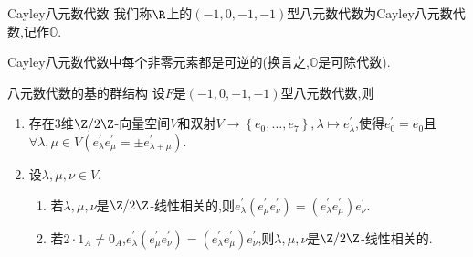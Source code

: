 \begin{definition}{Cayley八元数代数}{}
	我们称$\R$上的$\left(-1,0,-1,-1\right)$型八元数代数为Cayley八元数代数,记作$\mathbb{O}$.
\end{definition}

\begin{remark}{}{}
	Cayley八元数代数中每个非零元素都是可逆的(换言之,$\mathbb{O}$是可除代数).
\end{remark}

\begin{proposition}{八元数代数的基的群结构}{}
	设$F$是$\left(-1,0,-1,-1\right)$型八元数代数,则
	\begin{enumerate}
		\item 存在$3$维$\Z/2\Z$-向量空间$V$和双射$V\to\left\{e_{0},\ldots,e_{7}\right\},\lambda\mapsto e_{\lambda}^{\prime}$,使得$e_{0}^{\prime}=e_{0}$且$\forall\lambda,\mu\in V\left(e_{\lambda}^{\prime}e_{\mu}^{\prime}=\pm e_{\lambda+\mu}^{\prime}\right)$.
		\item 设$\lambda,\mu,\nu\in V$.
		\begin{enumerate}
			\item 若$\lambda,\mu,\nu$是$\Z/2\Z$-线性相关的,则$e_{\lambda}^{\prime}\left(e_{\mu}^{\prime}e_{\nu}^{\prime}\right)=\left(e_{\lambda}^{\prime}e_{\mu}^{\prime}\right)e_{\nu}^{\prime}$.
			\item 若$2\cdot 1_{A}\neq 0_{A}$,$e_{\lambda}^{\prime}\left(e_{\mu}^{\prime}e_{\nu}^{\prime}\right)=\left(e_{\lambda}^{\prime}e_{\mu}^{\prime}\right)e_{\nu}^{\prime}$,则$\lambda,\mu,\nu$是$\Z/2\Z$-线性相关的.
		\end{enumerate}
	\end{enumerate}
\end{proposition}













